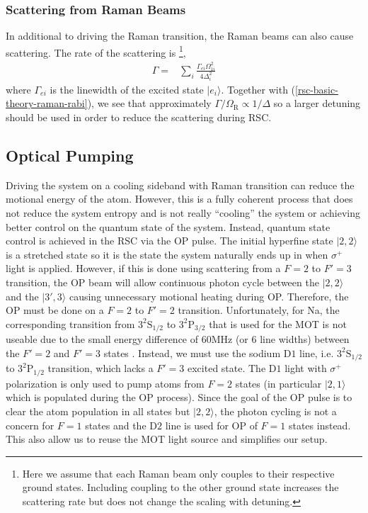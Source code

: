 \subsubsection{Scattering from Raman Beams}
\label{ch:rsc-basic-theory-raman-scatter}

In additional to driving the Raman transition, the Raman beams can also cause scattering.
The rate of the scattering is
\footnote{Here we assume that each Raman beam only couples to their respective ground states.
  Including coupling to the other ground state increases the scattering rate but does not change
  the scaling with detuning.},
\begin{align*}
  \Gamma=&\sum_{i}\frac{\Gamma_{ei}\Omega_{1i}^2}{4\Delta_i^2}
\end{align*}
where $\Gamma_{ei}$ is the linewidth of the excited state $|e_i\rangle$.
Together with (\ref{rsc-basic-theory-raman-rabi}), we see that approximately
$\Gamma/\Omega_{\mathrm{R}}\propto1/\Delta$ so a larger detuning should be used
in order to reduce the scattering during RSC.

\subsection{Optical Pumping}
\label{ch:rsc-basic-theory-op}

Driving the system on a cooling sideband with Raman transition can reduce the
motional energy of the atom. However, this is a fully coherent process that does
not reduce the system entropy and is not really ``cooling'' the system
or achieving better control on the quantum state of the system.
Instead, quantum state control is achieved in the RSC via the OP pulse.
The initial hyperfine state $|2,2\rangle$ is a stretched state so it is the
state the system naturally ends up in when $\sigma^+$ light is applied.
However, if this is done using scattering from a $F=2$ to $F'=3$ transition,
the OP beam will allow continuous photon cycle
between the $|2,2\rangle$ and the $|3',3\rangle$ causing unnecessary motional heating during OP.
Therefore, the OP must be done on a $F=2$ to $F'=2$ transition.
Unfortunately, for Na, the corresponding transition
from $\mathrm{3^2S_{1/2}}$ to $\mathrm{3^2P_{3/2}}$
that is used for the MOT is not useable due to the small energy difference of
$60 \mathrm{MHz}$ (or $6$ line widths) between the $F'=2$ and $F'=3$ states
\cite{steck_sodium_nodate}.
Instead, we must use the sodium $\mathrm{D1}$ line,
i.e. $\mathrm{3^2S_{1/2}}$ to $\mathrm{3^2P_{1/2}}$ transition,
which lacks a $F'=3$ excited state.
The $\mathrm{D1}$ light with $\sigma^+$ polarization is only used to pump atoms from
$F=2$ states (in particular $|2,1\rangle$ which is populated during the OP process).
Since the goal of the OP pulse is to clear the atom population in all states but $|2,2\rangle$,
the photon cycling is not a concern for $F=1$ states and the $\mathrm{D2}$ line
is used for OP of $F=1$ states instead.
This also allow us to reuse the MOT light source and simplifies our setup.

